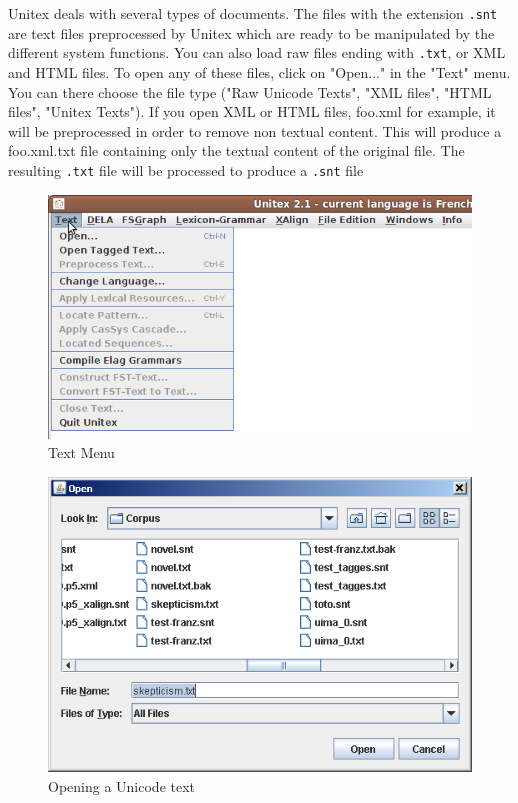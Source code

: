 Unitex deals with several types of documents. 
The files with the extension \verb+.snt+ are text files preprocessed by Unitex 
which are ready to be manipulated by the different system functions. 
You can also load raw files ending with \verb+.txt+, or XML and HTML files. 
To open any of these files, click on "Open..." in the
"Text" menu. You can there choose the file type ("Raw Unicode Texts", "XML files", "HTML files", "Unitex Texts").
If you open XML or HTML files, foo.xml for example, it will be preprocessed in order to remove non textual content. This will produce a foo.xml.txt file containing only the textual content of the original file. The resulting \verb+.txt+ file will be processed to produce a \verb+.snt+ file


\begin{figure}[!h]
\begin{center}
\includegraphics[width=14cm]{resources/img/fig2-7.png}
\caption{Text Menu}
\end{center}
\end{figure}

\begin{figure}[!h]
\begin{center}
\includegraphics[width=13cm]{resources/img/fig2-8.png}
\caption{Opening a Unicode text}
\end{center}
\end{figure}

